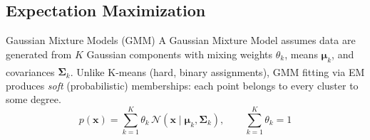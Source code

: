 \subsection{Expectation Maximization}

\begin{v3topic}{Gaussian Mixture Models (GMM)}
    A Gaussian Mixture Model assumes data are generated from $K$ Gaussian components with mixing weights $\theta_k$, means $\boldsymbol{\mu}_k$, and covariances $\boldsymbol{\Sigma}_k$\textsuperscript{\cite[][p.175]{iiiCourseMachineLearning}}. Unlike K-means (hard, binary assignments), GMM fitting via EM produces \emph{soft} (probabilistic) memberships: each point belongs to every cluster to some degree.
\visualseparator
    \begin{equation}
        p(\mathbf{x}) = \sum_{k=1}^{K} \theta_k \,\mathcal{N}(\mathbf{x} \mid \boldsymbol{\mu}_k, \boldsymbol{\Sigma}_k), \qquad \sum_{k=1}^{K}\theta_k = 1
    \end{equation}

\end{v3topic}
